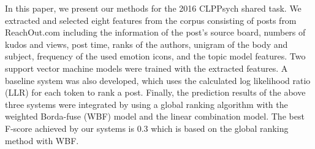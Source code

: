 In this paper, we present our methods for the 2016 CLPPsych shared task. We extracted and selected eight features from the corpus consisting of posts from ReachOut.com including the information of the post's source board, numbers of kudos and views, post time, ranks of the authors, unigram of the body and subject, frequency of the used emotion icons, and the topic model features. Two support vector machine models were trained with the extracted features. A baseline system was also developed, which uses the calculated log likelihood ratio (LLR) for each token to rank a post. Finally, the prediction results of the above three systems were integrated by using a global ranking algorithm with the weighted Borda-fuse (WBF) model and the linear combination model. The best F-score achieved by our systems is 0.3 which is based on the global ranking method with WBF.

